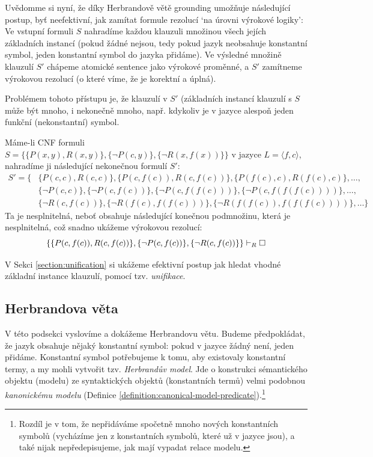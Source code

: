 Uvědomme si nyní, že díky Herbrandově větě grounding umožňuje následující postup, byť neefektivní, jak zamítat formule rezolucí `na úrovni výrokové logiky': Ve vstupní formuli $S$ nahradíme každou klauzuli množinou všech jejích základních instancí (pokud žádné nejsou, tedy pokud jazyk neobsahuje konstantní symbol, jeden konstantní symbol do jazyka přidáme). Ve výsledné množině klauzulí $S'$ chápeme atomické sentence jako výrokové proměnné, a $S'$ zamítneme výrokovou rezolucí (o které víme, že je korektní a úplná). 

Problémem tohoto přístupu je, že klauzulí v $S'$ (základních instancí klauzulí s $S$ může být mnoho, i nekonečně mnoho, např. kdykoliv je v jazyce alespoň jeden funkční (nekonstantní) symbol. 

\begin{example}
Máme-li CNF formuli $S=\{\{P(x,y),R(x,y)\},\{\neg P(c,y)\},\{\neg R(x,f(x))\}\}$ v jazyce $L=\langle f,c\rangle$, nahradíme ji následující nekonečnou formulí $S'$:
\begin{align*}
    S'=\{&\{P(c,c),R(c,c)\},\{P(c,f(c)),R(c,f(c))\},\{P(f(c),c),R(f(c),c)\},\dots,\\ 
    &\{\neg P(c,c)\}, \{\neg P(c,f(c))\},\{\neg P(c,f(f(c)))\},\{\neg P(c,f(f(f(c))))\}, \dots,\\
    &\{\neg R(c,f(c))\}, \{\neg R(f(c),f(f(c)))\},\{\neg R(f(f(c)),f(f(f(c))))\},\dots\}    
\end{align*}
Ta je nesplnitelná, neboť obsahuje následující konečnou podmnožinu, která je nesplnitelná, což snadno ukážeme výrokovou rezolucí:
$$
\{\{P(c,f(c)),R(c,f(c))\},\{\neg P(c,f(c))\},\{\neg R(c,f(c))\}\}\vdash_R\square
$$
\end{example}
V Sekci \ref{section:unification} si ukážeme efektivní postup jak hledat vhodné základní instance klauzulí, pomocí tzv. \emph{unifikace}.


\subsection{Herbrandova věta}

V této podsekci vyslovíme a dokážeme Herbrandovu větu. Budeme předpokládat, že jazyk obsahuje nějaký konstantní symbol: pokud v jazyce žádný není, jeden přidáme. Konstantní symbol potřebujeme k tomu, aby existovaly konstantní termy, a my mohli vytvořit tzv. \emph{Herbrandův model}. Jde o konstrukci sémantického objektu (modelu) ze syntaktických objektů (konstantních termů) velmi podobnou \emph{kanonickému modelu} (Definice \ref{definition:canonical-model-predicate}).\footnote{Rozdíl je v tom, že nepřidáváme spočetně mnoho nových konstantních symbolů (vycházíme jen z konstantních symbolů, které už v jazyce jsou), a také nijak nepředepisujeme, jak mají vypadat relace modelu.}

